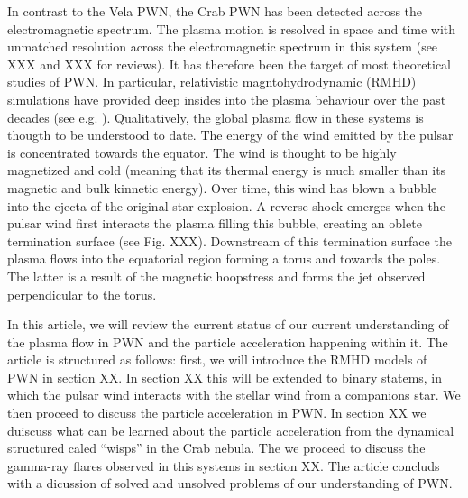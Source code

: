 In contrast to the Vela PWN, the Crab PWN has been detected across the electromagnetic spectrum. The plasma motion is resolved in space and time with unmatched resolution across the electromagnetic spectrum in this system (see XXX and XXX for reviews). It has therefore been the target of most theoretical studies of PWN. In particular, relativistic magntohydrodynamic (RMHD) simulations have provided deep insides into the plasma behaviour over the past decades (see e.g.  ). Qualitatively, the global plasma flow in these systems is thougth to be understood to date. The energy of the wind emitted by the pulsar is concentrated towards the equator. The wind is thought to be highly magnetized and cold (meaning that its thermal energy is much smaller than its magnetic and bulk kinnetic energy). Over time, this wind has blown a bubble into the ejecta of the original star explosion. A reverse shock emerges when the pulsar wind first interacts the plasma filling this bubble, creating an oblete termination surface (see Fig. XXX). Downstream of this termination surface the plasma flows into the equatorial region forming a torus and towards the poles. The latter is a result of the magnetic hoopstress and forms the jet observed perpendicular to the torus.

In this article, we will review the current status of our current understanding of the plasma flow in PWN and the particle acceleration happening within it.  The article is structured as follows: first, we will introduce the RMHD models of PWN in section XX. In section XX this will be extended to binary statems, in which the pulsar wind interacts with the stellar wind from a companions star. We then proceed to discuss the particle acceleration in PWN. In section XX we duiscuss what can be learned about the particle acceleration from the dynamical structured caled ``wisps'' in the Crab nebula. The we proceed to discuss the gamma-ray flares observed in this systems in section XX. The article concluds with a dicussion of solved and unsolved problems of our understanding of PWN.